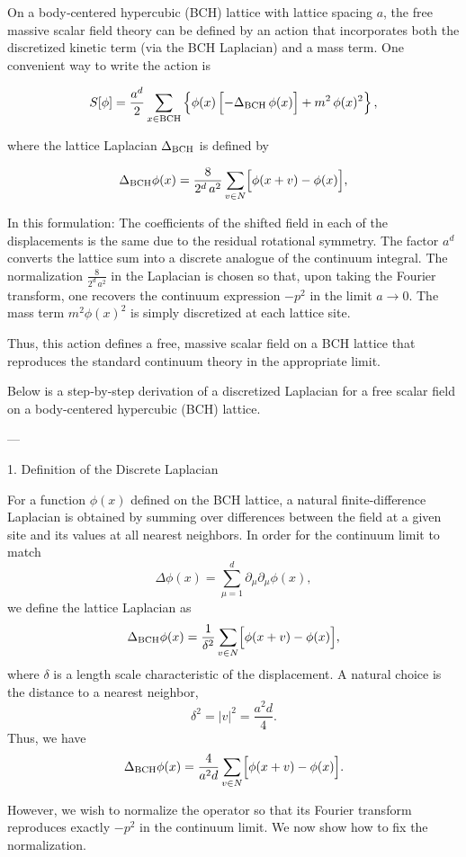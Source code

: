 {On a body‐centered hypercubic (BCH) lattice with lattice spacing \(a\), the free massive scalar field theory can be defined by an action that incorporates both the discretized kinetic term (via the BCH Laplacian) and a mass term. One convenient way to write the action is

\[
S[\phi] = \frac{a^d}{2} \sum_{x\in \text{BCH}} \left\{ \phi(x)\,\Bigl[-\Delta_{\rm BCH}\,\phi(x)\Bigr] + m^2\,\phi(x)^2 \right\},
\]

where the lattice Laplacian \(\Delta_{\rm BCH}\) is defined by

\[
\Delta_{\rm BCH}\phi(x) = \frac{8}{2^d\,a^2} \sum_{v\in N}\Bigl[\phi(x+v)-\phi(x)\Bigr],
\]

In this formulation:
The coefficients of the shifted field in each of the displacements is the same due to the residual rotational symmetry.
The factor \(a^d\) converts the lattice sum into a discrete analogue of the continuum integral.
The normalization \(\frac{8}{2^d\,a^2}\) in the Laplacian is chosen so that, upon taking the Fourier transform, one recovers the continuum expression \(-p^2\) in the limit \(a\to 0\).
The mass term \(m^2\phi(x)^2\) is simply discretized at each lattice site.

Thus, this action defines a free, massive scalar field on a BCH lattice that reproduces the standard continuum theory in the appropriate limit.

Below is a step‐by‐step derivation of a discretized Laplacian for a free scalar field on a body‐centered hypercubic (BCH) lattice.

---

1. Definition of the Discrete Laplacian

For a function \(\phi(x)\) defined on the BCH lattice, a natural finite-difference Laplacian is obtained by summing over differences between the field at a given site and its values at all nearest neighbors. In order for the continuum limit to match
\[
\Delta \phi(x) = \sum_{\mu=1}^d \partial_\mu\partial_\mu \phi(x),
\]
we define the lattice Laplacian as
\[
\Delta_{\rm BCH}\phi(x) = \frac{1}{\delta^2}\sum_{v\in N}\Bigl[\phi(x+v)-\phi(x)\Bigr],
\]
where \(\delta\) is a length scale characteristic of the displacement. A natural choice is the distance to a nearest neighbor,
\[
\delta^2 = |v|^2 = \frac{a^2 d}{4}.
\]
Thus, we have
\[
\Delta_{\rm BCH}\phi(x) = \frac{4}{a^2 d}\sum_{v\in N}\Bigl[\phi(x+v)-\phi(x)\Bigr].
\]

However, we wish to normalize the operator so that its Fourier transform reproduces exactly \(-p^2\) in the continuum limit. We now show how to fix the normalization.

}
